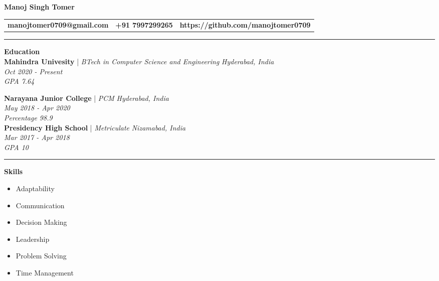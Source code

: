 \documentclass[a4paper, oneside, 12pt]{article}
\begin{document}
\begin{center}

{\Huge{\textbf{Manoj Singh Tomer}}} \\
\vspace{5mm}

\begin{tabular}{l | c | r}
\textbf{manojtomer0709@gmail.com} & \textbf{+91 7997299265} & \textbf{https://github.com/manojtomer0709}
\end{tabular}

\end{center}
\hrule

\vspace{5mm}

\begin{flushleft}
{\Large\textbf{Education}} \\
\vspace{2mm}
\textbf{Mahindra Univesity} | \textit{BTech in Computer Science and Engineering} \textit{\hfill Hyderabad, India} \\
\textit{Oct 2020 - Present} \\
\textit{GPA 7.64}

\vspace{5mm}
\textbf{Narayana Junior College} | \textit{PCM} \textit{\hfill Hyderabad, India} \\
\textit{May 2018 - Apr 2020} \\
\textit{Percentage 98.9} \\

\vspace{5mm}
\textbf{Presidency High School} | \textit{Metriculate} \textit{\hfill Nizamabad, India} \\
\textit{Mar 2017 - Apr 2018} \\
\textit{GPA 10} \\

\vspace{5mm}
\hrule
\vspace{5mm}
{\Large\textbf{Skills}} \\


\begin{multicols}{2}
\begin{itemize}
\item Adaptability
\item Communication
\item Decision Making
\item Leadership
\item Problem Solving
\item Time Management
\end{itemize}
\end{multicols}


\end{flushleft}
\end{document}

